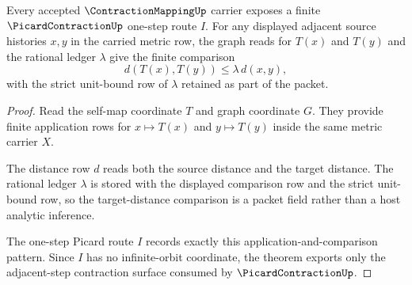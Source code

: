 \begin{theorem}
\label{thm:contraction-mapping-picard-step-contraction}
Every accepted $\ContractionMappingUp$ carrier exposes a finite $\PicardContractionUp$ one-step route $I$. For any displayed adjacent source histories $x,y$ in the carried metric row, the graph reads for $T(x)$ and $T(y)$ and the rational ledger $\lambda$ give the finite comparison
$$
d(T(x),T(y))\leq \lambda\, d(x,y),
$$
with the strict unit-bound row of $\lambda$ retained as part of the packet.
\end{theorem}
\begin{proof}
Read the self-map coordinate $T$ and graph coordinate $G$. They provide finite application rows for $x\mapsto T(x)$ and $y\mapsto T(y)$ inside the same metric carrier $X$.

The distance row $d$ reads both the source distance and the target distance. The rational ledger $\lambda$ is stored with the displayed comparison row and the strict unit-bound row, so the target-distance comparison is a packet field rather than a host analytic inference.

The one-step Picard route $I$ records exactly this application-and-comparison pattern. Since $I$ has no infinite-orbit coordinate, the theorem exports only the adjacent-step contraction surface consumed by $\PicardContractionUp$.
\end{proof}

